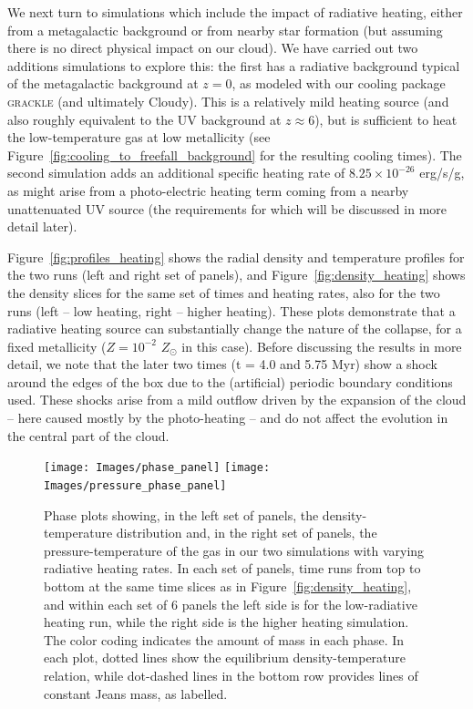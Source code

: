 \documentclass[useAMS,usenatbib]{mn2e}
\begin{document}
We next turn to simulations which include the impact of radiative heating, either from a metagalactic background or from nearby star
formation (but assuming there is no direct physical impact on our cloud).  We have carried out two additions simulations to explore
this: the first has a radiative background typical of the \citet{Haardt2012} metagalactic background at $z=0$, as modeled with our
cooling package \textsc{grackle} (and ultimately Cloudy).  This is a relatively mild heating source (and also roughly equivalent to the UV background at $z \approx 6$), but is sufficient to heat the low-temperature gas at low metallicity (see Figure~\ref{fig:cooling_to_freefall_background} for the resulting cooling times).
The second simulation adds an additional specific heating rate of $8.25\times10^{-26}$ erg/s/g, as might arise from a photo-electric
heating term coming from a nearby unattenuated UV source (the requirements for which will be discussed in more detail later).

Figure~\ref{fig:profiles_heating} shows the radial density and temperature profiles for the two runs (left and right set of panels),
and Figure~\ref{fig:density_heating} shows the density slices for the same set of times and heating rates, also for the two runs
(left -- low heating, right -- higher heating). These plots demonstrate that a radiative heating source can substantially change
the nature of the collapse, for a fixed metallicity ($Z=10^{-2}$ $Z_\odot$ in this case).   Before discussing the results in more detail,
we note that the later two times (t = 4.0 and 5.75 Myr) show a shock around the edges of the box due to the (artificial) periodic
boundary conditions used.   These shocks arise from a mild outflow driven by the expansion of the cloud -- here caused mostly by the photo-heating --
and do not affect the evolution in the central part of the cloud.

\begin{figure}
\begin{center}
\hspace{-0.4cm}
\texttt{[image: Images/phase\_panel]} \hspace{-1cm}
\texttt{[image: Images/pressure\_phase\_panel]} \hspace{-1.5cm}
\end{center}
\caption{\label{fig:phase_panels} Phase plots showing, in the left set of panels, the density-temperature distribution and, in the right set of panels, the pressure-temperature of the gas in our two simulations with varying radiative heating rates.   In each set of panels, time runs from top to bottom at the same time slices as in Figure~\ref{fig:density_heating}, and within each set of 6 panels the left side is for the low-radiative heating run, while the right side is the higher heating simulation.  The color coding indicates the amount of mass in each phase.   In each plot, dotted lines show the equilibrium density-temperature relation, while dot-dashed lines in the bottom row provides lines of constant Jeans mass, as labelled.}
\end{figure}
\end{document}
